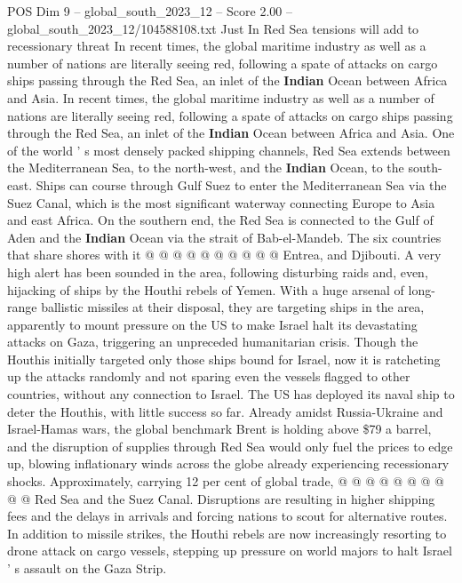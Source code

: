 \begin{textsample}{POS Dim 9 – global\_south\_2023\_12 – Score 2.00 – global\_south\_2023\_12/104588108.txt}  \label{ex:f9_pos_140}
Just In Red Sea tensions will add to recessionary threat In recent times, the global maritime industry as well as a number of nations are literally seeing red, following a spate of attacks on cargo ships passing through the Red Sea, an inlet of the \textbf{Indian} Ocean between Africa and Asia.
In recent times, the global maritime industry as well as a number of nations are literally seeing red, following a spate of attacks on cargo ships passing through the Red Sea, an inlet of the \textbf{Indian} Ocean between Africa and Asia.
One of the world ' s most densely packed shipping channels, Red Sea extends between the Mediterranean Sea, to the north-west, and the \textbf{Indian} Ocean, to the south-east.
Ships can course through Gulf Suez to enter the Mediterranean Sea via the Suez Canal, which is the most significant waterway connecting Europe to Asia and east Africa.
On the southern end, the Red Sea is connected to the Gulf of Aden and the \textbf{Indian} Ocean via the strait of Bab-el-Mandeb.
The six countries that share shores with it @ @ @ @ @ @ @ @ @ @ Entrea, and Djibouti.
A very high alert has been sounded in the area, following disturbing raids and, even, hijacking of ships by the Houthi rebels of Yemen.
With a huge arsenal of long-range ballistic missiles at their disposal, they are targeting ships in the area, apparently to mount pressure on the US to make Israel halt its devastating attacks on Gaza, triggering an unpreceded humanitarian crisis.
Though the Houthis initially targeted only those ships bound for Israel, now it is ratcheting up the attacks randomly and not sparing even the vessels flagged to other countries, without any connection to Israel.
The US has deployed its naval ship to deter the Houthis, with little success so far.
Already amidst Russia-Ukraine and Israel-Hamas wars, the global benchmark Brent is holding above \$79 a barrel, and the disruption of supplies through Red Sea would only fuel the prices to edge up, blowing inflationary winds across the globe already experiencing recessionary shocks.
Approximately, carrying 12 per cent of global trade, @ @ @ @ @ @ @ @ @ @ Red Sea and the Suez Canal.
Disruptions are resulting in higher shipping fees and the delays in arrivals and forcing nations to scout for alternative routes.
In addition to missile strikes, the Houthi rebels are now increasingly resorting to drone attack on cargo vessels, stepping up pressure on world majors to halt Israel ' s assault on the Gaza Strip.

\end{textsample}
